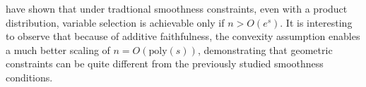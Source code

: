 \begin{remark}
\citet{dalalyan:12} have shown that under tradtional smoothness constraints, even with a product distribution, variable selection is achievable only if $n > O(e^s)$. It is interesting to observe that because of additive faithfulness, the convexity assumption enables a much better scaling of $n = O(\textrm{poly}(s))$, demonstrating that geometric constraints can be quite different from the previously studied smoothness conditions.
\end{remark}



 
